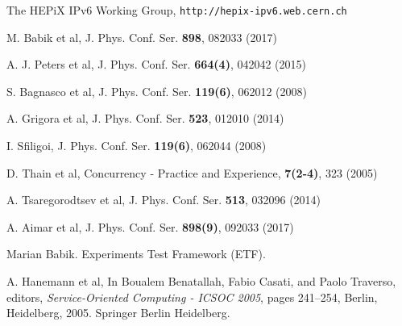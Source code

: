 \begin{thebibliography}{}
%
%


 The HEPiX IPv6 Working Group, {\tt http://hepix-ipv6.web.cern.ch}

M. Babik et al, J. Phys. Conf. Ser. {\bf898}, 082033 (2017)


 A. J. Peters et al, J. Phys. Conf. Ser. {\bf664(4)}, 042042 (2015)



S. Bagnasco et al, J. Phys. Conf. Ser. {\bf119(6)}, 062012 (2008)

A. Grigora et al, J. Phys. Conf. Ser. {\bf523}, 012010 (2014)

I. Sfiligoi, J. Phys. Conf. Ser. {\bf119(6)}, 062044 (2008)

D. Thain et al, Concurrency - Practice and Experience, {\bf 7(2-4)}, 323 (2005)

 A. Tsaregorodtsev et al, J. Phys. Conf. Ser. {\bf513}, 032096 (2014)



A. Aimar et al, J. Phys. Conf. Ser. {\bf 898(9)}, 092033 (2017)


Marian Babik.
\newblock Experiments {Test} {Framework} ({ETF}).

A. Hanemann et al, 
\newblock In Boualem Benatallah, Fabio Casati, and Paolo Traverso, editors,
  {\em Service-Oriented Computing - ICSOC 2005}, pages 241--254, Berlin, Heidelberg, 2005. Springer Berlin Heidelberg.


\end{thebibliography}
